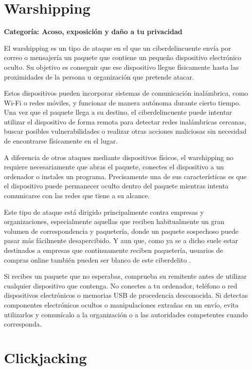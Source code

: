 \documentclass[
  spanish,
  a4paper,
  openany]{book}
\begin{document}
\section{Warshipping}\label{warshipping}

\textbf{Categoría: Acoso, exposición y daño a tu privacidad}

El warshipping es un tipo de ataque en el que un ciberdelincuente envía por correo o mensajería un paquete que contiene un pequeño dispositivo electrónico oculto. Su objetivo es conseguir que ese dispositivo llegue físicamente hasta las proximidades de la persona u organización que pretende atacar.

Estos dispositivos pueden incorporar sistemas de comunicación inalámbrica, como Wi-Fi o redes móviles, y funcionar de manera autónoma durante cierto tiempo. Una vez que el paquete llega a su destino, el ciberdelincuente puede intentar utilizar el dispositivo de forma remota para detectar redes inalámbricas cercanas, buscar posibles vulnerabilidades o realizar otras acciones maliciosas sin necesidad de encontrarse físicamente en el lugar.

A diferencia de otros ataques mediante dispositivos físicos, el warshipping no requiere necesariamente que abras el paquete, conectes el dispositivo a un ordenador o instales un programa. Precisamente una de sus características es que el dispositivo puede permanecer oculto dentro del paquete mientras intenta comunicarse con las redes que tiene a su alcance.

Este tipo de ataque está dirigido principalmente contra empresas y organizaciones, especialmente aquellas que reciben habitualmente un gran volumen de correspondencia y paquetería, donde un paquete sospechoso puede pasar más fácilmente desapercibido. Y aun que, como ya se a dicho suele estar destinados a empresas que continuamente reciben paquetería, usuarios de compras online también pueden ser blanco de este ciberdelito \citep{INCI-warshipping}.

Si recibes un paquete que no esperabas, comprueba su remitente antes de utilizar cualquier dispositivo que contenga. No conectes a tu ordenador, teléfono o red dispositivos electrónicos o memorias USB de procedencia desconocida. Si detectas componentes electrónicos ocultos o manipulaciones extrañas en un envío, evita utilizarlos y comunícalo a la organización o a las autoridades competentes cuando corresponda.

\section{Clickjacking}\label{clickjacking}
\end{document}
